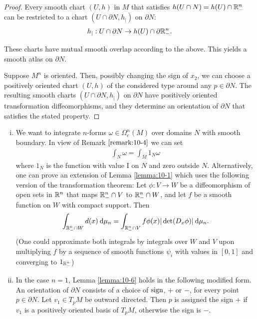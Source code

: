 \begin{proof}
  Every smooth chart $(U, h)$ in $M$ that satisfies $h(U\cap N) = h(U)\cap{\ensuremath{\mathbb{R}}}^n_-$ can
be restricted to a chart $(U\cap\partial N, h_|)$ on $\partial N$:
\begin{align*}
  h_|: U\cap\partial N\to h(U)\cap\partial{\ensuremath{\mathbb{R}}}^n_-.
\end{align*}

These charts have mutual smooth overlap according to the above. This yields a
smooth atlas on $\partial N$.

Suppose $M^n$ is oriented. Then, possibly changing the sign of $x_2$, we can choose
a positively oriented chart $(U, h)$ of the considered type around any $p\in\partial N$. The
resulting smooth charts $(U\cap\partial N, h_|)$ on $\partial N$ have positively oriented 
transformation diffeomorphisms, and they determine an orientation of $\partial N$ that satisfies 
the stated property.
\end{proof}


\begin{remark}\label{remark:10-7} 
  \begin{enumerate}[(i)]
    \item We want to integrate $n$-forms $\omega\in\Omega_c^n(M)$ over domains $N$ with smooth
      boundary. In view of Remark $\ref{remark:10-4}$ we can set
      \begin{align*}
        \int_N\omega = \int_M 1_N\omega
      \end{align*}
      where $1_N$ is the function with value I on $N$ and zero outside $N$.
      Alternatively, one can prove an extension of Lemma \ref{lemma:10-1} which uses
      the following version of the transformation theorem: Let $\phi:V\to W$ be
      a diffeomorphism of open sets in ${\mathbb{R}}^n$ that maps ${\mathbb{R}}^n_-\cap V$ to ${\mathbb{R}}^n_-\cap W$, 
      and let $f$ be a smooth function on $W$ with compact support. Then
      \begin{align*}
        \int_{\RR^n_-\cap W} d(x)\dd\mu_n 
        = \int_{\RR^n_-\cap V} f\phi(x) |\det(D_x\phi)|\dd\mu_n.
      \end{align*}
      (One could approximate both integrals by integrals over $W$ and $V$ upon
      multiplying $f$ by a sequence of smooth functions $\psi_i$ with values in $[0, 1]$
      and converging to $1_{{\mathbb{R}}^n_-}$)
    \item In the case $n = 1$, Lemma \ref{lemma:10-6} holds in the following modified form. An
      orientation of $\partial N$ consists of a choice of $\mathrm{sign}$, $+$ or $-$, for every point
      $p\in\partial N$. Let $v_1\in T_pM$ be outward directed. Then $p$ is assigned the sign
      $+$ if $v_1$ is a positively oriented basis of $T_pM$, otherwise the sign is $-$.
  \end{enumerate}
\end{remark}

